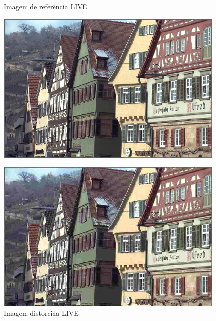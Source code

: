 \begin{figure}[htb]
 \label{fig:liveex}
 \centering
  \begin{minipage}{0.45\textwidth}
    \centering
    \caption{Imagem de referência LIVE} \label{fig:liveref}
    \includegraphics[scale=0.80]{../img/liveref66.pdf}
  \end{minipage}
  \hfill
  \begin{minipage}{0.45\textwidth}
    \centering
    \caption{Imagem distorcida LIVE} \label{fig:livedist}
    \includegraphics[scale=0.80]{../img/liveref90.pdf}
  \end{minipage}
\end{figure}

